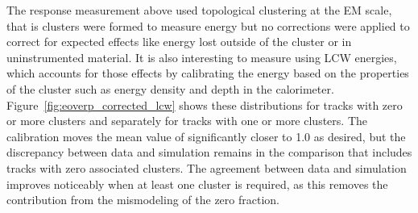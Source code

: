 The response measurement above used topological clustering at the EM scale, that is clusters were formed to measure energy but no corrections were applied to correct for expected effects like energy lost outside of the cluster or in uninstrumented material. 
It is also interesting to measure \epcor using \ac{LCW} energies, which accounts for those effects by calibrating the energy based on the properties of the cluster such as energy density and depth in the calorimeter.
Figure~\ref{fig:eoverp_corrected_lcw} shows these distributions for tracks with zero or more clusters and separately for tracks with one or more clusters.
The calibration moves the mean value of \epcor significantly closer to 1.0 as desired, but the discrepancy between data and simulation remains in the comparison that includes tracks with zero associated clusters.
The agreement between data and simulation improves noticeably when at least one cluster is required, as this removes the contribution from the mismodeling of the zero fraction. 

